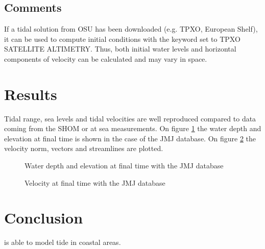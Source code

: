 \subsection{Comments}
%
If a tidal solution from OSU has been downloaded (e.g. TPXO, European
Shelf), it can be used to compute initial conditions with the keyword
 set to TPXO SATELLITE ALTIMETRY.
Thus, both initial water levels and horizontal components of velocity
can be calculated and may vary in space.
%
%
%
\section{Results}
%
Tidal range, sea levels and tidal velocities are well reproduced compared to
data coming from the SHOM or at sea measurements. On figure \ref{fig:tide:H} the water depth
and elevation at final time is shown in the case of the JMJ database. 
On figure \ref{fig:tide:U} the velocity norm, vectors and streamlines are plotted.

\begin{figure}[!htbp]
\begin{minipage}[t]{0.5\textwidth}
 \centering
\end{minipage}%
\begin{minipage}[t]{0.5\textwidth}
 \centering
\end{minipage}
  \caption{Water depth and elevation at final time with the JMJ database}\label{fig:tide:H}
\end{figure}

\begin{figure}[H]
\begin{minipage}[t]{0.5\textwidth}
 \centering
\end{minipage}%
\begin{minipage}[t]{0.5\textwidth}
 \centering
\end{minipage}
  \caption{Velocity at final time with the JMJ database}\label{fig:tide:U}
\end{figure}


\section{Conclusion}
%
 is able to model tide in coastal areas.
%
%
